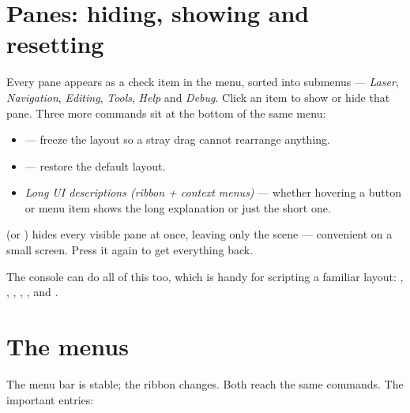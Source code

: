 \section{Panes: hiding, showing and resetting}
\label{sec:panes}

Every pane appears as a check item in the  menu, sorted into
submenus --- \emph{Laser}, \emph{Navigation}, \emph{Editing}, \emph{Tools},
\emph{Help} and \emph{Debug}. Click an item to show or hide that pane. Three more
commands sit at the bottom of the same menu:

\begin{itemize}
  \item {} --- freeze the layout so a stray drag cannot rearrange
        anything.
  \item {} --- restore the default layout.
  \item \emph{Long UI descriptions (ribbon + context menus)} --- whether hovering
        a button or menu item shows the long explanation or just the short one.
\end{itemize}

\noindent {} (or ) hides
every visible pane at once, leaving only the scene --- convenient on a small
screen. Press it again to get everything back.

\begin{tipbox}
The console can do all of this too, which is handy for scripting a familiar
layout: , , ,
, ,  and
.
\end{tipbox}

\section{The menus}
\label{sec:menus}

The menu bar is stable; the ribbon changes. Both reach the same commands. The
important entries:

